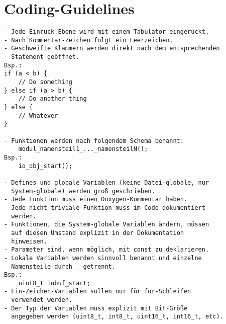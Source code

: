 \chapter{Coding-Guidelines \label{appendix_cg}}
\begin{verbatim}
- Jede Einrück-Ebene wird mit einem Tabulator eingerückt.
- Nach Kommentar-Zeichen folgt ein Leerzeichen.
- Geschweifte Klammern werden direkt nach dem entsprechenden
  Statement geöffnet.
Bsp.:
if (a < b) {
    // Do something
} else if (a > b) {
    // Do another thing
} else {
    // Whatever
}

- Funktionen werden nach folgendem Schema benannt:
    modul_namensteil1_..._namensteilN();
Bsp.:
    io_obj_start();

- Defines und globale Variablen (keine Datei-globale, nur
  System-globale) werden groß geschrieben.
- Jede Funktion muss einen Doxygen-Kommentar haben.
- Jede nicht-triviale Funktion muss im Code dokumentiert
  werden.
- Funktionen, die System-globale Variablen ändern, müssen
  auf diesen Umstand explizit in der Dokumentation
  hinweisen.
- Parameter sind, wenn möglich, mit const zu deklarieren.
- Lokale Variablen werden sinnvoll benannt und einzelne
  Namensteile durch _ getrennt.
Bsp.:
    uint8_t inbuf_start;
- Ein-Zeichen-Variablen sollen nur für for-Schleifen
  verwendet werden.
- Der Typ der Variablen muss explizit mit Bit-Größe
  angegeben werden (uint8_t, int8_t, uint16_t, int16_t, etc).
\end{verbatim}
